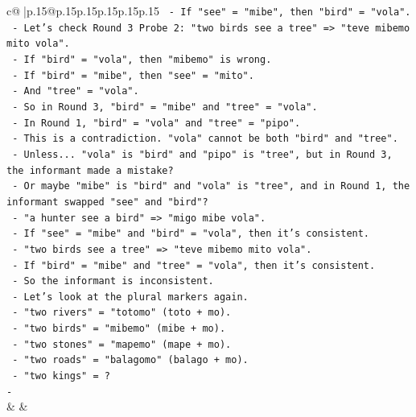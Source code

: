 \documentclass{article}
\begin{document}
{\begin{supertabular}{c@{$\;$}|p{.15\linewidth}@{}p{.15\linewidth}p{.15\linewidth}p{.15\linewidth}p{.15\linewidth}p{.15\linewidth}}
{{{\texttt{                            {-} If "see" = "mibe", then "bird" = "vola".} \\
\texttt{                          {-} Let's check Round 3 Probe 2: "two birds see a tree" => "teve mibemo mito vola".} \\
\texttt{                            {-} If "bird" = "vola", then "mibemo" is wrong.} \\
\texttt{                            {-} If "bird" = "mibe", then "see" = "mito".} \\
\texttt{                            {-} And "tree" = "vola".} \\
\texttt{                          {-} So in Round 3, "bird" = "mibe" and "tree" = "vola".} \\
\texttt{                          {-} In Round 1, "bird" = "vola" and "tree" = "pipo".} \\
\texttt{                          {-} This is a contradiction. "vola" cannot be both "bird" and "tree".} \\
\texttt{                          {-} Unless... "vola" is "bird" and "pipo" is "tree", but in Round 3, the informant made a mistake?} \\
\texttt{                          {-} Or maybe "mibe" is "bird" and "vola" is "tree", and in Round 1, the informant swapped "see" and "bird"?} \\
\texttt{                          {-} "a hunter see a bird" => "migo mibe vola".} \\
\texttt{                            {-} If "see" = "mibe" and "bird" = "vola", then it's consistent.} \\
\texttt{                          {-} "two birds see a tree" => "teve mibemo mito vola".} \\
\texttt{                            {-} If "bird" = "mibe" and "tree" = "vola", then it's consistent.} \\
\texttt{                          {-} So the informant is inconsistent.} \\
\texttt{                          {-} Let's look at the plural markers again.} \\
\texttt{                            {-} "two rivers" = "totomo" (toto + mo).} \\
\texttt{                            {-} "two birds" = "mibemo" (mibe + mo).} \\
\texttt{                            {-} "two stones" = "mapemo" (mape + mo).} \\
\texttt{                            {-} "two roads" = "balagomo" (balago + mo).} \\
\texttt{                            {-} "two kings" = ?} \\
\texttt{                            {-}} \\
            }
        }
    }
    & & \\ \\


\end{supertabular}}
\end{document}
